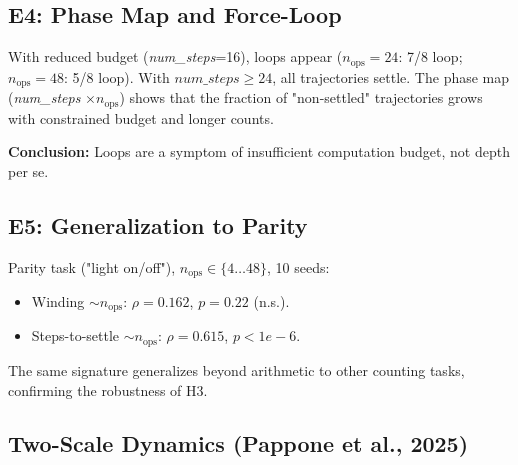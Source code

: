 \subsection{E4: Phase Map and Force-Loop}

With reduced budget (\textit{num\_steps}=16), loops appear ($n_{\text{ops}}=24$: 7/8 loop; $n_{\text{ops}}=48$: 5/8 loop). With $\textit{num\_steps} \ge 24$, all trajectories settle. The phase map (\textit{num\_steps} $\times n_{\text{ops}}$) shows that the fraction of "non-settled" trajectories grows with constrained budget and longer counts.

\textbf{Conclusion:} Loops are a symptom of insufficient computation budget, not depth per se.

\subsection{E5: Generalization to Parity}

Parity task ("light on/off"), $n_{\text{ops}} \in \{4\ldots 48\}$, 10 seeds:

\begin{itemize}
    \item Winding $\sim n_{\text{ops}}$: $\rho = 0.162$, $p = 0.22$ (n.s.).
    \item Steps-to-settle $\sim n_{\text{ops}}$: $\rho = 0.615$, $p < 1e-6$.
\end{itemize}

The same signature generalizes beyond arithmetic to other counting tasks, confirming the robustness of H3.

\subsection{Two-Scale Dynamics (Pappone et al., 2025)}

